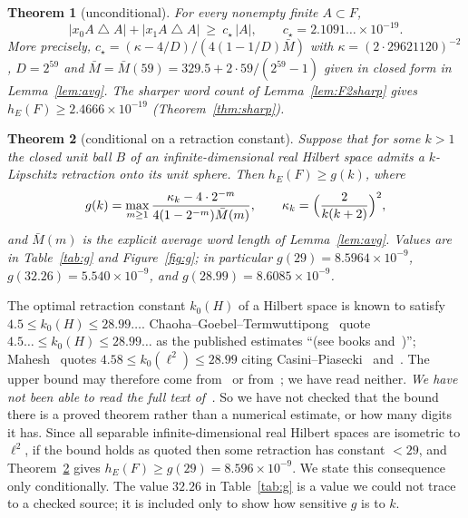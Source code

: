 \documentclass[11pt]{article}
\newtheorem{theorem}{Theorem}[section]
\theoremstyle{definition}
\theoremstyle{remark}
\newcommand{\sd}{\mathbin{\triangle}}
\newcommand{\hE}{h_E}
\begin{document}
\begin{theorem}[unconditional]\label{thm:main}
For every nonempty finite $A\subset F$,
\[
  |x_0A\sd A|+|x_1A\sd A|\ \ge\ c_\star\,|A|,\qquad c_\star=2.1091\ldots\times10^{-19}.
\]
More precisely, $c_\star=(\kappa-4/D)/(4(1-1/D)\bar M)$ with $\kappa=(2\cdot 29621120)^{-2}$,
$D=2^{59}$ and $\bar M=\bar M(59)=329.5+2\cdot59/(2^{59}-1)$ given in closed form in Lemma~\ref{lem:avg}.
The sharper word count of Lemma~\ref{lem:F2sharp} gives $\hE(F)\ge 2.4666\times10^{-19}$
(Theorem~\ref{thm:sharp}).
\end{theorem}

\begin{theorem}[conditional on a retraction constant]\label{thm:cond}
Suppose that for some $k>1$ the closed unit ball $B$ of an infinite-dimensional real Hilbert space
admits a $k$-Lipschitz retraction onto its unit sphere. Then $\hE(F)\ge g(k)$, where
\[
 g(k)=\max_{m\ge1}\frac{\kappa_k-4\cdot2^{-m}}{4(1-2^{-m})\bar M(m)},\qquad
 \kappa_k=\Bigl(\frac{2}{k(k+2)}\Bigr)^{2},
\]
and $\bar M(m)$ is the explicit average word length of Lemma~\ref{lem:avg}. Values are in
Table~\ref{tab:g} and Figure~\ref{fig:g}; in particular $g(29)=8.5964\times10^{-9}$,
$g(32.26)=5.540\times10^{-9}$, and $g(28.99)=8.6085\times10^{-9}$.
\end{theorem}

The optimal retraction constant $k_0(H)$ of a Hilbert space is known to satisfy
$4.5\le k_0(H)\le 28.99\ldots$. Chaoha--Goebel--Termwuttipong~\cite{CGT} quote $4.5\ldots\le k_0(H)\le28.99\ldots$ as the
published estimates ``(see books and~\cite{BCF})''; Mahesh~\cite{Mahesh} quotes
$4.58\le k_0(\ell^2)\le 28.99$ citing Casini--Piasecki~\cite{CP} and~\cite{BCF}. The upper bound
may therefore come from~\cite{BCF} or from~\cite{CP}; we have read neither. \emph{We have not been able to read the full text
of~\cite{BCF}.} So we have not checked that the
bound there is a proved theorem rather than a numerical estimate, or how many digits it has. Since
all separable infinite-dimensional real Hilbert spaces are isometric to $\ell^2$, if the bound
holds as quoted then some retraction has constant $<29$, and Theorem~\ref{thm:cond} gives
$\hE(F)\ge g(29)=8.596\times10^{-9}$. We state this consequence only conditionally. The value
$32.26$ in Table~\ref{tab:g} is a value we could not trace to a checked source; it is included only
to show how sensitive $g$ is to $k$.
\end{document}
